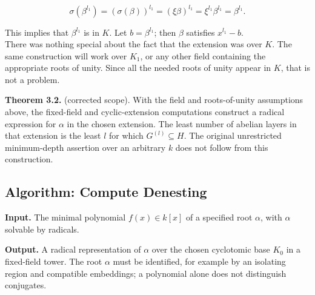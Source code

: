 \documentclass[11pt,letterpaper]{article}
\begin{document}
\[
\sigma\left(\beta^{l_{1}}\right)=(\sigma(\beta))^{l_1}=(\xi \beta)^{l_{1}}=\xi^{l_{1}} \beta^{l_{1}}=\beta^{l_{1}} .
\]

This implies that $\beta^{l_{1}}$ is in $K$. Let $b=\beta^{l_{1}}$; then $\beta$ satisfies $x^{l_{1}}-b$.\\
There was nothing special about the fact that the extension was over $K$. The same construction will work over $K_{1}$, or any other field containing the appropriate roots of unity. Since all the needed roots of unity appear in $K$, that is not a problem.

\noindent\textbf{Theorem 3.2.} (corrected scope). With the field and roots-of-unity assumptions above, the fixed-field and cyclic-extension computations construct a radical expression for $\alpha$ in the chosen extension. The least number of abelian layers in that extension is the least $l$ for which $G^{(l)}\subseteq H$. The original unrestricted minimum-depth assertion over an arbitrary $k$ does not follow from this construction.

\subsection*{Algorithm: Compute Denesting}
\noindent\textbf{Input.} The minimal polynomial $f(x)\in k[x]$ of a specified root $\alpha$, with $\alpha$ solvable by radicals.

\noindent\textbf{Output.} A radical representation of $\alpha$ over the chosen cyclotomic base $K_0$ in a fixed-field tower. The root $\alpha$ must be identified, for example by an isolating region and compatible embeddings; a polynomial alone does not distinguish conjugates.
\end{document}

